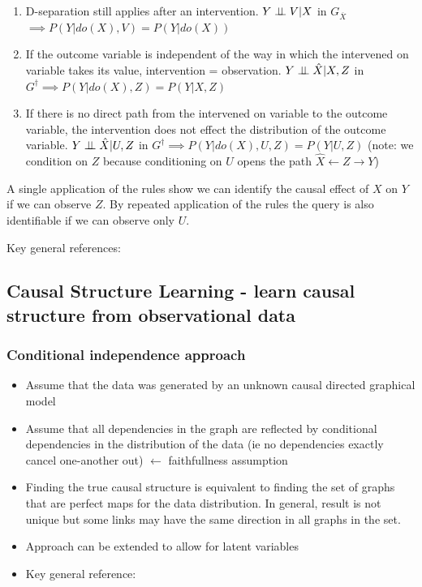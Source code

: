 \documentclass{article}
\begin{document}
\begin{enumerate}
\item D-separation still applies after an intervention. $Y \perp\!\!\!\perp V|X$ in $G_{\overline{X}}$ $\implies P(Y|do(X),V) = P(Y|do(X))$
\item If the outcome variable is independent of the way in which the intervened on variable takes its value, intervention = observation. $Y \perp\!\!\!\perp \hat{X}|X,Z$ in $G^{\dagger} \implies P(Y|do(X),Z) = P(Y|X,Z)$
\item If there is no direct path from the intervened on variable to the outcome variable, the intervention does not effect the distribution of the outcome variable. $Y \perp\!\!\!\perp \hat{X}|U,Z$ in  $G^{\dagger} \implies P(Y|do(X),U,Z) = P(Y|U,Z)$ (note: we condition on $Z$ because conditioning on $U$ opens the path $\hat{X} \leftarrow Z \rightarrow Y$)
\end{enumerate}

A single application of the rules show we can identify the causal effect of $X$ on $Y$ if we can observe $Z$. By repeated application of the rules the query is also identifiable if we can observe only $U$.


Key general references: \cite{Pearl2000,Koller2009}

\subsection*{Causal Structure Learning - learn causal structure from observational data}
\subsubsection*{Conditional independence approach} 

\begin{itemize}
\item Assume that the data was generated by an unknown causal directed graphical model
\item Assume that all dependencies in the graph are reflected by conditional dependencies in the distribution of the data (ie no dependencies exactly cancel one-another out) $\leftarrow$ faithfullness assumption
\item Finding the true causal structure is equivalent to finding the set of graphs that are perfect maps for the data distribution. In general, result is not unique but some links may have the same direction in all graphs in the set.
\item Approach can be extended to allow for latent variables
\item Key general reference: \cite{Sprites}
\end{itemize}
\end{document}
